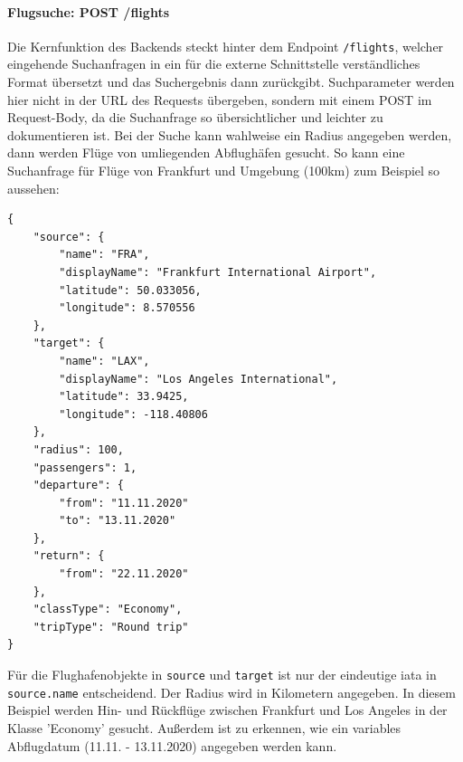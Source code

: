 \documentclass[12pt,twoside,a4paper]{article}
\begin{document}
\begin{sloppypar}
\paragraph[Flugsuche]{Flugsuche: POST /flights}
Die Kernfunktion des Backends steckt hinter dem Endpoint \texttt{/flights}, welcher eingehende Suchanfragen in ein für die externe Schnittstelle verständliches Format übersetzt und das Suchergebnis dann zurückgibt. Suchparameter werden hier nicht in der URL des Requests übergeben, sondern mit einem POST im Request-Body, da die Suchanfrage so übersichtlicher und leichter zu dokumentieren ist. Bei der Suche kann wahlweise ein Radius angegeben werden, dann werden Flüge von umliegenden Abflughäfen gesucht.
\newpage
So kann eine Suchanfrage für Flüge von Frankfurt und Umgebung (100km) zum Beispiel so aussehen:
\begin{Verbatim}
{
	"source": {
		"name": "FRA",
		"displayName": "Frankfurt International Airport",
		"latitude": 50.033056,
		"longitude": 8.570556
	},
	"target": {
		"name": "LAX",
		"displayName": "Los Angeles International",
		"latitude": 33.9425,
		"longitude": -118.40806
	},
	"radius": 100,
	"passengers": 1,
	"departure": {
		"from": "11.11.2020"
		"to": "13.11.2020"
	},
	"return": {
		"from": "22.11.2020"
	},
	"classType": "Economy",
	"tripType": "Round trip"
}
\end{Verbatim}
Für die Flughafenobjekte in \texttt{source} und \texttt{target} ist nur der eindeutige \acrlong{iata} in \texttt{source.name} entscheidend. Der Radius wird in Kilometern angegeben. In diesem Beispiel werden Hin- und Rückflüge zwischen Frankfurt und Los Angeles in der Klasse 'Economy' gesucht. Außerdem ist zu erkennen, wie ein variables Abflugdatum (11.11. - 13.11.2020) angegeben werden kann.

\end{sloppypar}
\end{document}
